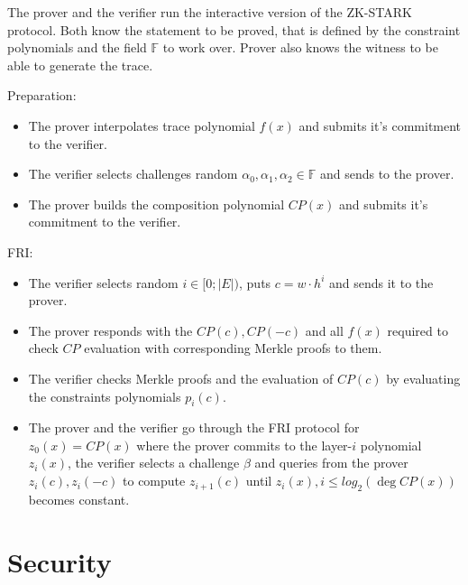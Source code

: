 \documentclass{zkdl-presentation-template}
\begin{document}
\begin{frame}  
    The prover and the verifier run the interactive version of the ZK-STARK protocol. Both know the statement to be proved, that is defined by the constraint polynomials and the field $\mathbb{F}$ to work over. Prover also knows the witness to be able to generate the trace.

    Preparation:
    \begin{itemize}[label=]
        \item The prover interpolates trace polynomial $f(x)$ and submits it's commitment to the verifier.
        \item The verifier selects challenges random $\alpha_0, \alpha_1, \alpha_2 \in \mathbb{F}$ and sends to the prover.
        \item The prover builds the composition polynomial $CP(x)$ and submits it's commitment to the verifier.
    \end{itemize}
\end{frame}

\begin{frame}
    FRI:
    \begin{itemize}[label=]
        \item The verifier selects random $i \in [0; |E|)$, puts $c = w\cdot h^i$ and sends it to the prover.
        \item The prover responds with the $CP(c), CP(-c)$ and all $f(x)$ required to check $CP$ evaluation with corresponding Merkle proofs to them.
        \item The verifier checks Merkle proofs and the evaluation of $CP(c)$ by evaluating the constraints polynomials $p_i(c)$.
        \item The prover and the verifier go through the FRI protocol for $z_0(x) = CP(x)$ where the prover commits to the layer-$i$ polynomial $z_i(x)$, the verifier selects a challenge $\beta$ and queries from the prover $z_i(c), z_i(-c)$ to compute $z_{i+1}(c)$ until $z_i(x), i \leq log_2(\deg CP(x))$ becomes constant.
    \end{itemize}
\end{frame}

\section{Security}
\end{document}
